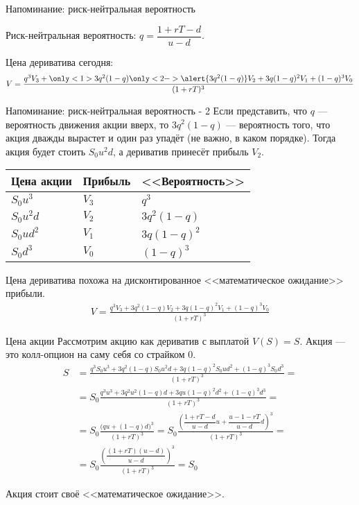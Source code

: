 \documentclass{beamer}
\begin{document}
\begin{frame}{Напоминание: риск-нейтральная вероятность}

\justify
Риск-нейтральная вероятность: $q = \dfrac{1 + rT - d}{u - d}$.

\justify
Цена дериватива сегодня:
\begin{align*}
V = \frac{q^3V_3 + \only<1>{3q^2(1-q)}\only<2->{\alert{3q^2(1-q)}}V_2 + 3q(1-q)^2V_1 + (1-q)^3V_0}{(1+rT)^3}
\end{align*}
\end{frame}



\begin{frame}{Напоминание: риск-нейтральная вероятность - 2}
\justify
Если представить, что $q$ --- вероятность движения акции вверх, то $3q^2(1-q)$ --- вероятность того, что акция дважды вырастет и один раз упадёт (не важно, в каком порядке). Тогда акция будет стоить $S_0u^2d$, а дериватив принесёт прибыль $V_2$.

\justify
\centering
\begin{tabular}{l|l|l}
Цена акции & Прибыль & <<Вероятность>> \\ \hline
$S_0u^3$   & $V_3$   & $q^3$ \\
$S_0u^2d$  & $V_2$   & $3q^2(1-q)$ \\
$S_0ud^2$  & $V_1$   & $3q(1-q)^2$ \\ 
$S_0d^3$   & $V_0$   & $(1-q)^3$ 
\end{tabular}

\justify
Цена дериватива похожа на дисконтированное <<математическое ожидание>> прибыли.
\begin{align*}
V = \frac{q^3V_3 + 3q^2(1-q)V_2 + 3q(1-q)^2V_1 + (1-q)^3V_0}{(1+rT)^3}
\end{align*}
\end{frame}



\begin{frame}{Цена акции}
\justify
Рассмотрим акцию как дериватив с выплатой $V(S) = S$. Акция --- это колл-опцион на саму себя со страйком 0.
\begin{align*}
S &= \frac{q^3S_0u^3 + 3q^2(1-q)S_0u^2d + 3q(1-q)^2S_0ud^2 + (1-q)^3S_0d^3}{(1+rT)^3} = \\
&= S_0\frac{q^3u^3 + 3q^2u^2(1-q)d + 3qu(1-q)^2d^2 + (1-q)^3d^3}{(1+rT)^3} = \\
&= S_0\frac{\Big(qu + (1-q)d \Big)^3}{(1+rT)^3} 
= S_0\frac{\left(\dfrac{1+rT-d}{u-d}u + \dfrac{u-1-rT}{u-d}d \right)^3}{(1+rT)^3} = \\
&= S_0 \frac{\left(\dfrac{(1+rT)(u-d)}{u-d} \right)^3}{(1+rT)^3} = S_0
\end{align*}

\justify
Акция стоит своё <<математическое ожидание>>.
\end{frame}
\end{document}
